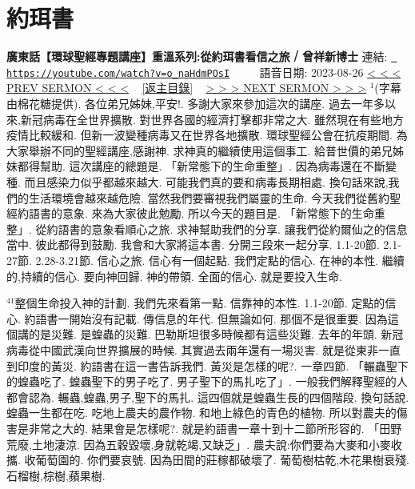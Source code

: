 \documentclass{book}
\begin{document}
\section{約珥書}
\label{sec:o_naHdmPOsI}
\textbf{廣東話【環球聖經專題講座】重溫系列:從約珥書看信之旅 ⧸ 曾祥新博士}
\newline
\newline
連結: \href{https://youtube.com/watch?v=o_naHdmPOsI}{\texttt{ https://youtube.com/watch?v=o\_naHdmPOsI}} ~~~~ 語音日期: 2023-08-26 
\newline
\newline
\hyperref[sec:8a3cVfOxFFc]{\small{< < < PREV SERMON < < <}}
~
\hyperref[sec:index]{\small{[返主目錄]}}
~
\hyperref[sec:9f0Ts61CPMI]{\small{> > > NEXT SERMON > > >}}
\newline
\newline
$^{1}$(字幕由棉花糖提供).
各位弟兄姊妹,平安!.
多謝大家來參加這次的講座.
過去一年多以來,新冠病毒在全世界擴散.
對世界各國的經濟打擊都非常之大.
雖然現在有些地方疫情比較緩和.
但新一波變種病毒又在世界各地擴散.
環球聖經公會在抗疫期間.
為大家舉辦不同的聖經講座,感謝神.
求神真的繼續使用這個事工.
給普世價的弟兄姊妹都得幫助.
這次講座的總題是.
「新常態下的生命重整」.
因為病毒還在不斷變種.
而且感染力似乎都越來越大.
可能我們真的要和病毒長期相處.
換句話來說,我們的生活環境會越來越危險.
當然我們要審視我們屬靈的生命.
今天我們從舊約聖經約語書的意象.
來為大家彼此勉勵.
所以今天的題目是.
「新常態下的生命重整」.
從約語書的意象看順心之旅.
求神幫助我們的分享.
讓我們從約爾仙之的信息當中.
彼此都得到鼓勵.
我會和大家將這本書.
分開三段來一起分享.
1.1-20節.
2.1-27節.
2.28-3.21節.
信心之旅.
信心有一個起點.
我們定點的信心.
在神的本性.
繼續的,持續的信心.
要向神回歸.
神的帶領.
全面的信心.
就是要投入生命.

$^{41}$整個生命投入神的計劃.
我們先來看第一點.
信靠神的本性.
1.1-20節.
定點的信心.
約語書一開始沒有記載.
傳信息的年代.
但無論如何.
那個不是很重要.
因為這個講的是災難.
是蝗蟲的災難.
巴勒斯坦很多時候都有這些災難.
去年的年頭.
新冠病毒從中國武漢向世界擴展的時候.
其實過去兩年還有一場災害.
就是從東非一直到印度的黃災.
約語書在這一書告訴我們.
黃災是怎樣的呢?.
一章四節.
「輾蟲聖下的蝗蟲吃了.
蝗蟲聖下的男子吃了.
男子聖下的馬扎吃了」.
一般我們解釋聖經的人都會認為.
輾蟲,蝗蟲,男子,聖下的馬扎.
這四個就是蝗蟲生長的四個階段.
換句話說.
蝗蟲一生都在吃.
吃地上農夫的農作物.
和地上綠色的青色的植物.
所以對農夫的傷害是非常之大的.
結果會是怎樣呢?.
就是約語書一章十到十二節所形容的.
「田野荒廢,土地淒涼.
因為五穀毀壞,身就乾竭,又缺乏」.
農夫說:你們要為大麥和小麥收攜.
收葡萄園的.
你們要哀號.
因為田間的莊稼都破壞了.
葡萄樹枯乾,木花果樹衰殘.
石榴樹,棕樹,蘋果樹.
\end{document}

